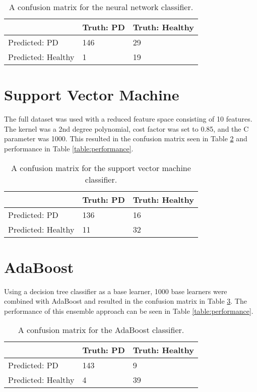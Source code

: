 \documentclass[draftcopy]{srpaper}
\begin{document}
\begin{table}
\begin{center}
\begin{tabular}{|l|l|l|} 
\hline
& Truth: PD & Truth: Healthy \\ \hline
Predicted: PD & 146 & 29 \\ \hline
Predicted: Healthy & 1 & 19 \\ \hline

\end{tabular}
\end{center}
\caption[Confusion Matrix for Neural Network]{A confusion matrix for
  the neural network classifier.}
\label{table:NNCM}
\end{table}

\section{Support Vector Machine}
The full dataset was used with a reduced feature space consisting of
10 features. The kernel was a 2nd degree polynomial, cost factor was set to 0.85, and the C parameter was
1000. This resulted in the confusion matrix seen in Table
\ref{table:SVMCM} and performance in Table \ref{table:performance}.

\begin{table}
\begin{center}
\begin{tabular}{|l|l|l|}
\hline
 & Truth: PD & Truth: Healthy \\ \hline
Predicted: PD & 136 & 16 \\ \hline
Predicted: Healthy &  11 & 32 \\ \hline

\end{tabular}
\end{center}
\caption[Confusion Matrix for Neural Network]{A confusion matrix for
  the support vector machine classifier.}
\label{table:SVMCM}
\end{table}

\section{AdaBoost}
Using a decision tree classifier as a base learner, 1000 base learners
were combined with AdaBoost and
resulted in the confusion matrix in Table \ref{table:ABCM}. The
performance of this ensemble approach can be seen in Table \ref{table:performance}.

\begin{table}
\begin{center}
\begin{tabular}{|l|l|l|}
\hline

 & Truth: PD & Truth: Healthy \\ \hline
Predicted: PD & 143 & 9 \\ \hline
Predicted: Healthy &  4 & 39 \\ \hline

\end{tabular}
\end{center}
\caption[Confusion Matrix for AdaBoost]{A confusion matrix for
  the AdaBoost classifier.}
\label{table:ABCM}
\end{table}
\end{document}
